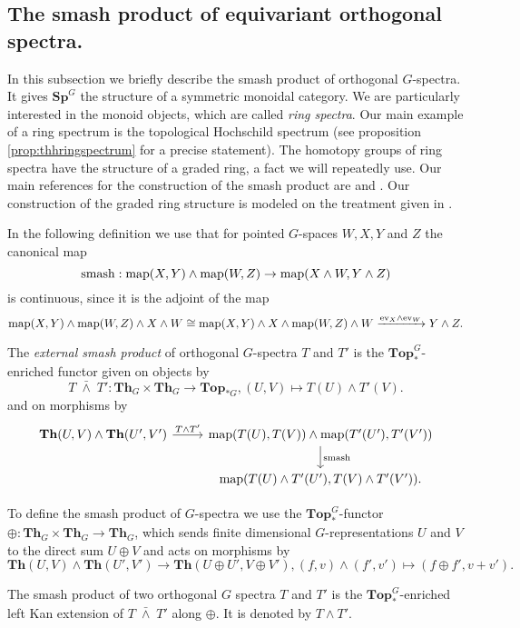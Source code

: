 \subsection{The smash product of equivariant orthogonal spectra.}
In this subsection we briefly describe the smash product of orthogonal
$G$-spectra. It gives $\mathbf{Sp}^G$ the structure of a symmetric monoidal
category. We are particularly interested in the monoid objects, which
are called \textit{ring spectra}. Our main example of a ring spectrum
is the topological Hochschild spectrum (see proposition \ref{prop:thhringspectrum} for a 
precise statement). The homotopy groups of ring
spectra have the structure of a graded ring, a fact we will repeatedly use.
Our main references for the construction of the smash product are 
\cite[Section~II.2, \pno~33-35]{mandellmay} and \cite[Section~21, \pno~59-60]{mmssdiagramspectra}.
Our construction of the graded ring structure is modeled on the treatment
given in \cite[Chapter~4, \pno~37-40]{schwedeequivariant}.

In the following definition we use that for pointed $G$-spaces
$W,X,Y$ and $Z$ the canonical map
\begin{equation}\label{eq:mappingspacesmash}
\mathrm{smash}:\mathrm{map}(X,Y)\wedge\mathrm{map}(W,Z)\to \mathrm{map}(X\wedge W, Y\wedge Z)
\end{equation}
is continuous, since it is the adjoint of the map
\[
\mathrm{map}(X,Y)\wedge\mathrm{map}(W,Z)\wedge X\wedge W\cong
\mathrm{map}(X,Y)\wedge X\wedge \mathrm{map}(W,Z)\wedge W
\xrightarrow{\mathrm{ev}_X\wedge \mathrm{ev}_W}
Y\wedge Z.
\]
 \begin{mydef}
 The \textit{external smash product} of orthogonal $G$-spectra $T$ and $T'$ is
 the $\mathbf{Top}_{\ast}^G$-enriched functor given on objects by
 \[
T\;\bar{\wedge} \;T' : \mathbf{Th}_G\times  \mathbf{Th}_G\to \mathbf{Top}_{\ast G}, 
(U,V)\mapsto T(U)\wedge T'(V).
 \]
 and on morphisms by
\[
\begin{tikzcd}
\mathbf{Th}(U,V) \wedge \mathbf{Th}(U',V')
\arrow{r}{T\wedge T'}
&\map(T(U),T(V))\wedge \map(T'(U'), T'(V'))
\arrow{d}{\mathrm{smash}}\\
&\map(T(U)\wedge T'(U'), T(V)\wedge T'(V')).
\end{tikzcd}
\]
 \end{mydef}
To define the smash product of $G$-spectra we use
 the $\mathbf{Top}_{\ast}^G$-functor
$\oplus:\mathbf{Th}_G\times \mathbf{Th}_G\to \mathbf{Th}_G$,
which sends finite dimensional
$G$-representations $U$ and $V$ to the direct sum $U\oplus V$
and acts on morphisms by
\[
\mathbf{Th}(U,V)\wedge \mathbf{Th}(U',V')\to \mathbf{Th}(U\oplus U',V\oplus V'), (f, v)\wedge (f',v')\mapsto (f\oplus f', v+v').
\]
\begin{mydef}
The smash product of two orthogonal $G$ spectra $T$ and $T'$ is
the $\mathbf{Top}_\ast^G$-enriched left Kan extension
of $T\;\bar{\wedge}\; T'$ along $\oplus$. It is denoted by $T\wedge T'$.
\end{mydef}


